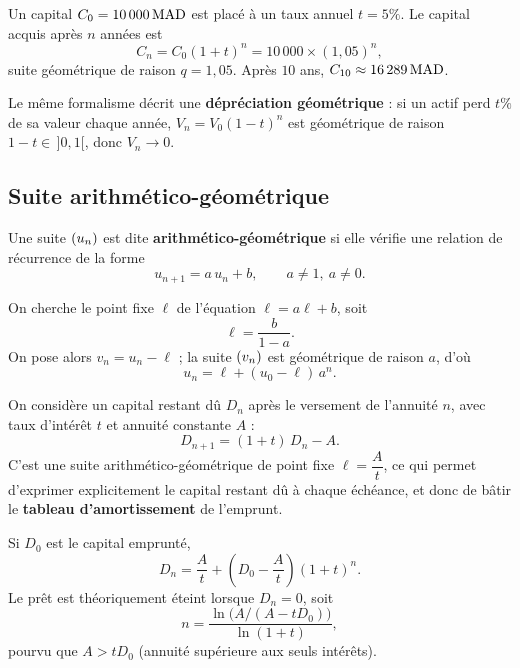 \documentclass[12pt,a4paper]{article}
\begin{document}
\begin{gestionbox}
Un capital $C_0 = 10\,000\,\mathrm{MAD}$ est placé à un taux annuel $t = 5\%$. Le capital acquis après $n$ années est
\[
C_n = C_0 (1+t)^n = 10\,000 \times (1{,}05)^n,
\]
suite géométrique de raison $q=1{,}05$. Après $10$ ans, $C_{10} \approx 16\,289\,\mathrm{MAD}$.
\end{gestionbox}

\begin{remarquebox}
Le même formalisme décrit une \textbf{dépréciation géométrique} : si un actif perd $t\%$ de sa valeur chaque année, $V_n = V_0 (1-t)^n$ est géométrique de raison $1-t\in\,]0,1[$, donc $V_n\to 0$.
\end{remarquebox}

\subsection{Suite arithmético-géométrique}

\begin{definitionbox}[10.3]
Une suite $(u_n)$ est dite \textbf{arithmético-géométrique} si elle vérifie une relation de récurrence de la forme
\[
u_{n+1} = a\, u_n + b, \qquad a\neq 1,\ a\neq 0.
\]
\end{definitionbox}

\begin{propbox}
On cherche le point fixe $\ell$ de l'équation $\ell = a\ell + b$, soit
\[
\ell = \dfrac{b}{1-a}.
\]
On pose alors $v_n = u_n - \ell$ ; la suite $(v_n)$ est géométrique de raison $a$, d'où
\[
u_n = \ell + (u_0 - \ell)\, a^n.
\]
\end{propbox}

\begin{gestionbox}
On considère un capital restant dû $D_n$ après le versement de l'annuité $n$, avec taux d'intérêt $t$ et annuité constante $A$ :
\[
D_{n+1} = (1+t)\, D_n - A.
\]
C'est une suite arithmético-géométrique de point fixe $\ell = \dfrac{A}{t}$, ce qui permet d'exprimer explicitement le capital restant dû à chaque échéance, et donc de bâtir le \textbf{tableau d'amortissement} de l'emprunt.
\end{gestionbox}

\begin{methodebox}
Si $D_0$ est le capital emprunté,
\[
D_n = \dfrac{A}{t} + \left(D_0 - \dfrac{A}{t}\right)(1+t)^n.
\]
Le prêt est théoriquement éteint lorsque $D_n=0$, soit
\[
n = \dfrac{\ln\bigl(A / (A - t D_0)\bigr)}{\ln(1+t)},
\]
pourvu que $A > t D_0$ (annuité supérieure aux seuls intérêts).
\end{methodebox}
\end{document}
